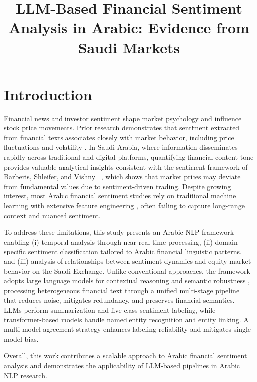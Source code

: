 \documentclass[10pt,a4paper]{article}
\title{LLM-Based Financial Sentiment Analysis in Arabic: Evidence from Saudi Markets}
\begin{document}
\maketitleabstract



\section{Introduction}
Financial news and investor sentiment shape market psychology and influence stock price movements. Prior research demonstrates that sentiment extracted from financial texts associates closely with market behavior, including price fluctuations and volatility \citep{Barberis1997, Ahmad2023}. In Saudi Arabia, where information disseminates rapidly across traditional and digital platforms, quantifying financial content tone provides valuable analytical insights consistent with the sentiment framework of Barberis, Shleifer, and Vishny ~\citep{Barberis1997}, which shows that market prices may deviate from fundamental values due to sentiment-driven trading. Despite growing interest, most Arabic financial sentiment studies rely on traditional machine learning with extensive feature engineering \citep{Ahmad2023}, often failing to capture long-range context and nuanced sentiment.

To address these limitations, this study presents an Arabic NLP framework enabling (i) temporal analysis through near real-time processing, (ii) domain-specific sentiment classification tailored to Arabic financial linguistic patterns, and (iii) analysis of relationships between sentiment dynamics and equity market behavior on the Saudi Exchange. Unlike conventional approaches, the framework adopts large language models for contextual reasoning and semantic robustness \citep{Gu2024, Wang2023}, processing heterogeneous financial text through a unified multi-stage pipeline that reduces noise, mitigates redundancy, and preserves financial semantics. LLMs perform summarization and five-class sentiment labeling, while transformer-based models handle named entity recognition and entity linking. A multi-model agreement strategy enhances labeling reliability and mitigates single-model bias.

Overall, this work contributes a scalable approach to Arabic financial sentiment analysis and demonstrates the applicability of LLM-based pipelines in Arabic NLP research.


\end{document}

